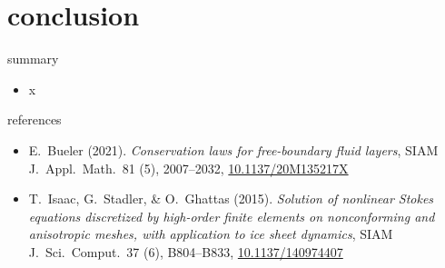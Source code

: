 \documentclass[svgnames,
               hyperref={colorlinks,citecolor=DeepPink4,linkcolor=FireBrick,urlcolor=Maroon},
               usepdftitle=false]  %
               {beamer}
\begin{document}
\section{conclusion}

\begin{frame}{\alert{summary}}

\begin{itemize}
\item x
\end{itemize}
\end{frame}


\begin{frame}{references}

{\scriptsize
\begin{itemize}
\item E.~Bueler (2021). \emph{Conservation laws for free-boundary fluid layers}, SIAM J.~Appl.~Math.~81 (5), 2007--2032, \href{https://doi.org/10.1137/20M135217X}{10.1137/20M135217X}
\item T.~Isaac, G.~Stadler, \& O.~Ghattas (2015). \emph{Solution of nonlinear Stokes equations discretized by high-order finite elements on nonconforming and anisotropic meshes, with application to ice sheet dynamics}, SIAM J.~Sci.~Comput.~37 (6), B804--B833, \href{https://doi.org/10.1137/140974407}{10.1137/140974407}
\end{itemize}
}
\end{frame}
\end{document}
